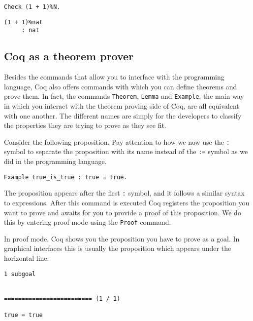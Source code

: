 \begin{verbatim}
Check (1 + 1)%N. 
\end{verbatim}
\vspace{-\baselineskip*3/2}
\begin{verbatim}
(1 + 1)%nat
     : nat
\end{verbatim}



\subsection{Coq as a theorem prover}
\label{sect:coq-proof-assistant}


Besides the commands that allow you to interface with the programming language, Coq also offers commands
with which you can define theorems and prove them. In fact, the commands \texttt{Theorem}, 
\texttt{Lemma} and \texttt{Example}, the main way in which you interact with the 
theorem proving side of Coq, are all equivalent with one another. The different names are simply for the 
developers to classify the properties they are trying to prove as they see fit.

Consider the following proposition. Pay attention to how we now use the \texttt{:} symbol to separate the 
proposition with its name instead of the \texttt{:=} symbol as we did in the programming language.

\begin{verbatim}
Example true_is_true : true = true.
\end{verbatim}

The proposition appears after the first \texttt{:} symbol, and it follows a similar syntax 
to expressions. %
After this command is executed Coq registers the proposition you want to prove and awaits for you
to provide a proof of this proposition. We do this by entering proof mode using the 
\texttt{Proof} command.

In proof mode, Coq shows you the proposition you have to prove as a goal. In graphical interfaces this
is usually the proposition which appears under the horizontal line.

\begin{verbatim}
1 subgoal


========================= (1 / 1)

true = true
\end{verbatim}

